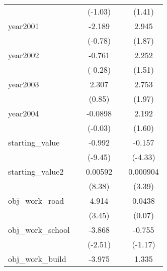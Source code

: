 {\begin{tabular}{l*{4}{c}}
            &                     &     (-1.03)         &                     &      (1.41)         \\
[1em]
year2001    &                     &      -2.189         &                     &       2.945         \\
            &                     &     (-0.78)         &                     &      (1.87)         \\
[1em]
year2002    &                     &      -0.761         &                     &       2.252         \\
            &                     &     (-0.28)         &                     &      (1.51)         \\
[1em]
year2003    &                     &       2.307         &                     &       2.753\sym{*}  \\
            &                     &      (0.85)         &                     &      (1.97)         \\
[1em]
year2004    &                     &     -0.0898         &                     &       2.192         \\
            &                     &     (-0.03)         &                     &      (1.60)         \\
[1em]
starting\_value&                     &      -0.992\sym{***}&                     &      -0.157\sym{***}\\
            &                     &     (-9.45)         &                     &     (-4.33)         \\
[1em]
starting\_value2&                     &     0.00592\sym{***}&                     &    0.000904\sym{***}\\
            &                     &      (8.38)         &                     &      (3.39)         \\
[1em]
obj\_work\_road&                     &       4.914\sym{***}&                     &      0.0438         \\
            &                     &      (3.45)         &                     &      (0.07)         \\
[1em]
obj\_work\_school&                     &      -3.868\sym{*}  &                     &      -0.755         \\
            &                     &     (-2.51)         &                     &     (-1.17)         \\
[1em]
obj\_work\_build&                     &      -3.975\sym{*}  &                     &       1.335         \\

\end{tabular}}
